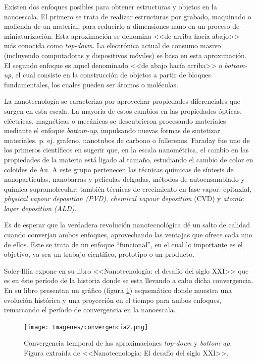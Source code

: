 		Existen dos enfoques posibles para obtener estructuras y objetos en la nanoescala. El primero se trata de realizar estructuras por grabado, maquinado o molienda de un material, para reducirlo a dimensiones nano en un proceso de miniaturización. Esta aproximación se denomina <<de arriba hacia abajo>> más conocida como \textit{top-down}. La electrónica actual de consumo masivo (incluyendo computadoras y dispositivos móviles) se basa en esta aproximación. El segundo enfoque es aquel denominado <<de abajo hacía arriba>> o \textit{bottom-up}, el cual consiste en la construcción de objetos a partir de bloques fundamentales, los cuales pueden ser átomos o moléculas. 

		La nanotecnología se caracteriza por aprovechar propiedades diferenciales que surgen en esta escala. La mayoría de estos cambios en las propiedades ópticas, eléctricas, magnéticas o mecánicas se descubrieron procesando materiales mediante el enfoque \textit{bottom-up}, impulsando nuevas formas de sintetizar materiales, p. ej. grafeno, nanotubos de carbono o fullerenos. Faraday fue uno de los primeros científicos en sugerir que, en la escala nanométrica, el cambio en las propiedades de la materia está ligado al tamaño, estudiando el cambio de color en coloides de Au\cite{faraday1857}. A este grupo pertenecen las técnicas químicas de síntesis de nanopartículas, nanobarras y películas delgadas, métodos de autoensamblado y química supramolecular; también técnicas de crecimiento en fase vapor: epitaxial, \textit{physical vapour deposition (PVD)}, \textit{chemical vapour deposition} (CVD) y \textit{atomic layer deposition (ALD)}.
			
		Es de esperar que la verdadera revolución nanotecnológica dé un salto de calidad cuando converjan ambos enfoques, aprovechando las ventajas que ofrece cada uno de ellos. Este se trata de un enfoque ``funcional'', en el cual lo importante es el objetivo, ya sea un trabajo científico, prototipo o un producto.

		Soler-Illia expone en su libro <<Nanotecnología: el desafío del siglo XXI>>\cite{nanotecnologia-galo} que es en éste período de la historia donde se esta llevando a cabo dicha convergencia. En su libro presentan un gráfico (figura \ref{fig:galo-convergencia}) esquemático donde muestra una evolución histórica y una proyección en el tiempo para ambos enfoques, remarcando el período de convergencia en la nanoescala.

			\begin{figure}[ht!]
 				\begin{center}
 				\texttt{[image: Imagenes/convergencia2.png]}
 				\caption[Convergencia \textit{top-down }y \textit{bottom-up.}]{Convergencia temporal de las aproximaciones \textit{top-down }y \textit{bottom-up.} Figura extraída de <<Nanotecnología: El desafío del siglo XXI>>.\cite{nanotecnologia-galo}}
 				\label{fig:galo-convergencia}
 		   	    \end{center}
 		   	    \end{figure}

